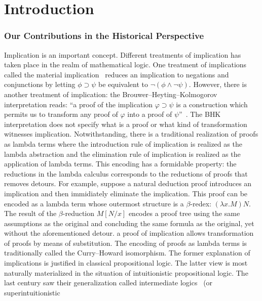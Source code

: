 \chapter{Introduction}

\subsection{Our Contributions in the Historical Perspective}

Implication is an important concept.
Different treatments of implication has taken place in the realm of
mathematical logic.
One treatment of implications called the material implication~
reduces an implication to negations and conjunctions by letting
$\phi\supset \psi$ be equivalent to $\neg (\phi \land \neg \psi)$.
However, there is another treatment of implication: the
Brouwer--Heyting--Kolmogorov interpretation reads: ``a proof of the
implication $\varphi\supset\psi$ is a construction which permits us to
 transform any proof of $\varphi$ into a proof of $\psi$''~.
The BHK
interpretation does not specify what is a proof or what kind of
transformation witnesses implication.
Notwithstanding, there is a
traditional realization of proofs as lambda terms where the
introduction rule of implication is realized as the lambda abstraction
and the elimination rule of implication is realized as the application
of lambda terms.
This encoding has a formidable property:
the reductions in the lambda calculus corresponds to the reductions of
proofs that
removes detours.
For example, suppose a natural deduction proof introduces an implication and then
immidiately eliminate the
implication.  This proof can be encoded as a lambda term whose outermost
structure is a $\beta$-redex: $(\lambda x. M)N$.
 The result of the $\beta$-reduction $M[N/x]$ encodes a proof tree using
 the same assumptions as the original and concluding the same formula as
 the original, yet without the aforementioned detour.
 a proof of implication allows transformation of proofs
by means of
substitution.  The encoding of proofs as lambda terms is traditionally
called the Curry--Howard isomorphism.
The former explanation of implications is justified in classical propositional logic.
The latter view is most naturally materialized in the situation of
intuitionistic propositional logic.  The last century saw their
generalization called intermediate logics~\citep{umezawa} (or superintuitionistic
